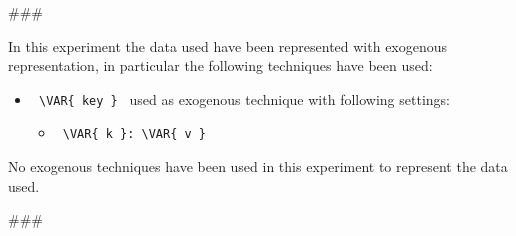 
\usepackage{comment}

###

In this experiment the data used have been represented with exogenous representation, in particular the
following techniques have been used:
\begin{itemize}
    \item
     \verb| \VAR{ key } | used as exogenous technique with following settings:
     \begin{itemize}
       \item
            \verb| \VAR{ k }: \VAR{ v }|
     \end{itemize}
\end{itemize}
No exogenous techniques have been used in this experiment to represent the data used.
\hfill\break
\hfill\break

###


\begin{comment}
Author = DIEGO MICCOLI
Alias = Kozen88
Organization = SWAP Research Group UniBa
Date = 27-12-2023

This mini template is not working by itself because there are latex command missing needed
to compile the file and give as output a pdf file, in addition it has been added jinja
statement in order to control the rendering of the latex file with the jinja library, for these
reasons it needs to be used with the other mini chunks in conjunction.
\end{comment}